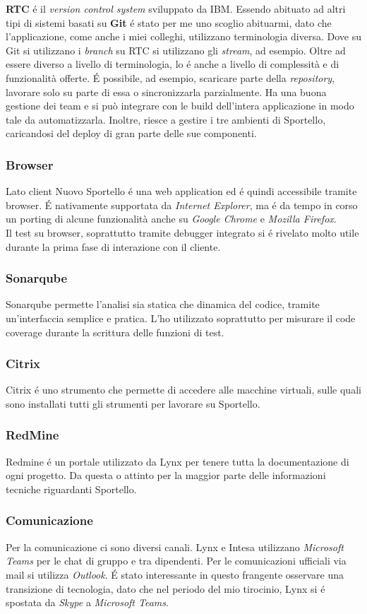 \textbf{RTC} é il \textit{version control system} sviluppato da IBM. Essendo abituato ad altri tipi di sistemi basati su \textbf{Git} é stato per me uno scoglio abituarmi, dato che l'applicazione, come anche i miei colleghi, utilizzano terminologia diversa. Dove su Git si utilizzano i \textit{branch} su RTC si utilizzano gli \textit{stream}, ad esempio. Oltre ad essere diverso a livello di terminologia, lo é anche a livello di complessità e di funzionalità offerte. É possibile, ad esempio, scaricare parte della \textit{repository}, lavorare solo su parte di essa o sincronizzarla parzialmente. Ha una buona gestione dei team e si può integrare con le build dell'intera applicazione in modo tale da automatizzarla. Inoltre, riesce a gestire i tre ambienti di Sportello, caricandosi del deploy di gran parte delle sue componenti. 

\subsubsection{Browser}
Lato client Nuovo Sportello é una web application ed é quindi accessibile tramite browser. É nativamente supportata da \textit{Internet Explorer}, ma é da tempo in corso un porting di alcune funzionalità anche su \textit{Google Chrome} e \textit{Mozilla Firefox}. \\
Il test su browser, soprattutto tramite debugger integrato si é rivelato molto utile durante la prima fase di interazione con il cliente. 

\subsubsection{Sonarqube}
Sonarqube permette l'analisi sia statica che dinamica del codice, tramite un'interfaccia semplice e pratica. L'ho utilizzato soprattutto per misurare il code coverage durante la scrittura delle funzioni di test. 

\subsubsection{Citrix}
Citrix é uno strumento che permette di accedere alle macchine virtuali, sulle quali sono installati tutti gli strumenti per lavorare su Sportello. 

\subsubsection{RedMine}
Redmine é un portale utilizzato da Lynx per tenere tutta la documentazione di ogni progetto. Da questa o attinto per la maggior parte delle informazioni tecniche riguardanti Sportello.

\subsubsection{Comunicazione}
Per la comunicazione ci sono diversi canali. Lynx e Intesa utilizzano \textit{Microsoft Teams} per le chat di gruppo e tra dipendenti. Per le comunicazioni ufficiali via mail si utilizza \textit{Outlook}. É stato interessante in questo frangente osservare una transizione di tecnologia, dato che nel periodo del mio tirocinio, Lynx si é spostata da \textit{Skype} a \textit{Microsoft Teams}.

